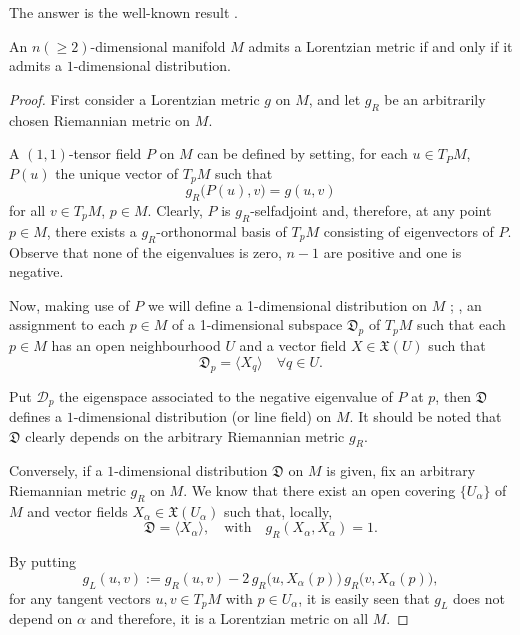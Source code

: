 The answer is the well-known result \cite{greub72}.

\begin{proposition}
	\label{line_fields}
    An $n(\geq 2)$-dimensional manifold $M$ admits a Lorentzian metric if and only if it admits a $1$-dimensional distribution.
\end{proposition}

\begin{proof}
    First consider a Lorentzian metric $g$ on $M$, and let $g_R$ be an arbitrarily chosen Riemannian metric on $M$.

    A $(1,1)$-tensor field $P$ on $M$ can be defined by setting, for each $u \in T_PM$, $P(u)$ the unique vector of $T_pM$ such that
    \[
	    g_R\big(P(u),v\big)=g(u,v)
    \]
    for all $v \in T_pM$, $p \in M$. Clearly, $P$ is $g_R$-selfadjoint and, therefore, at any point $p \in M$, there exists a $g_R$-orthonormal basis of $T_pM$ consisting of eigenvectors of $P$. Observe that none of the eigenvalues is zero, $n-1$ are positive and one is negative.
    
    Now, making use of $P$ we will define a 1-dimensional distribution on $M$ \cite{kobnom63}; \ie, an assignment to each $p \in M$ of a 1-dimensional subspace $\mathfrak{D}_p$ of $T_p M$ such that each $p\in M$ has an open neighbourhood $U$ and a vector field $X \in \mathfrak{X}(U)$ such that 
    \[
		\mathfrak{D}_p = \langle X_q \rangle \quad \forall q \in U.
    \]
    
    Put $\mathcal{D}_p$ the eigenspace associated to the negative eigenvalue of $P$ at $p$, then $\mathfrak{D}$ defines a $1$-dimensional distribution (or line field) on $M$. It should be noted that $\mathfrak{D}$ clearly depends on the arbitrary Riemannian metric $g_R$.

    Conversely, if a $1$-dimensional distribution $\mathfrak{D}$ on $M$ is given, fix an arbitrary Riemannian metric $g_R$ on $M$. We know that there exist an open covering $\{U_{\alpha}\}$ of $M$ and vector fields $X_\alpha \in \mathfrak{X}(U_\alpha)$ such that, locally,
    \[
	    \mathfrak{D}=\langle X_{\alpha} \rangle, \quad \mathrm{with} \quad
	    g_R(X_{\alpha},X_{\alpha})=1.
    \]

    By putting
    \[
        g_{L}(u,v):=g_{R}(u,v)-2\,g_{R}\big(u,X_{\alpha}(p)\big)\,g_{R}\big(v,X_{\alpha}(p)\big),
    \]
    for any tangent vectors $u,v \in T_{p}M$ with $p\in U_\alpha$, it is easily seen that $g_{L}$ does not depend on $\alpha$ and therefore, it is a Lorentzian metric on all $M$.
\end{proof}

